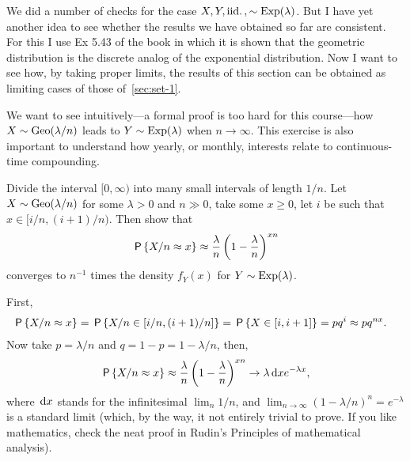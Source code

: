 \documentclass[a4paper,12pt]{article}
\begin{document}
We did a number of checks for the case $X, Y, \iid, \sim\Exp{\lambda}$.
But I have yet another idea to see whether the results we have obtained so far are consistent.
For this I use Ex 5.43 of the book in which it is shown that the geometric distribution is the discrete analog of the exponential distribution. Now I want to see how, by taking proper limits, the results of this section can be obtained as limiting cases of those of~\cref{sec:set-1}. 

\begin{exercise}\label{ex:7} We want to see intuitively---a formal proof is too hard for this course---how $X\sim \Geo{\lambda/n}$ leads to $Y\sim\Exp{\lambda}$ when $n\to\infty$. 
This exercise is also important to understand how yearly, or monthly, interests relate to continuous-time compounding.

Divide the interval $[0, \infty)$ into many small intervals of length $1/n$.
Let  $X\sim \Geo{\lambda/n}$ for some $\lambda>0$ and $n\gg 0$, take  some $x\geq 0$,  let $i$ be such that $x\in[i/n, (i+1)/n)$.
Then show that 
\begin{align}
\P{X/n \approx x} \approx \frac{\lambda} n \left(1-\frac \lambda n\right)^{xn} 
\end{align}
converges to $n^{-1}$ times the density $f_{Y}(x)$ for   $Y\sim \Exp{\lambda}$.
\begin{solution}
First, 
\begin{align}
\P{X/n \approx x} &= \P{X/n \in [i/n, (i+1)/n]} = \P{X \in [i, i+1]} = p q^{i} \approx p q^{n x}.
\end{align}
Now take $p=\lambda/n$ and $q=1-p=1-\lambda/n$, then,
\begin{equation}
\P{X/n \approx x} \approx \frac{\lambda} n \left(1-\frac \lambda n\right)^{xn} \to \lambda \d x e^{-\lambda x}, 
\end{equation}
where $\d x$ stands for the infinitesimal $\lim_{n}1/n$, and $\lim_{n\to\infty}(1-\lambda/n)^{n} = e^{-\lambda}$ is a standard limit (which, by the way, it not entirely trivial to prove. If you like mathematics, check the neat proof in Rudin's Principles of mathematical analysis). 
\end{solution}
\end{exercise}
\end{document}
